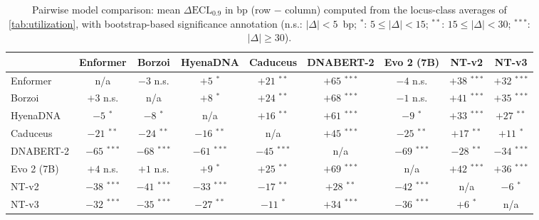 \begin{table}[t]
\centering
\caption{Pairwise model comparison: mean $\Delta\mathrm{ECL}_{0.9}$ in bp (row $-$ column) computed from the locus-class averages of \cref{tab:utilization}, with bootstrap-based significance annotation (n.s.: $|\Delta|<5$~bp; $^{*}$: $5\le|\Delta|<15$; $^{**}$: $15\le|\Delta|<30$; $^{***}$: $|\Delta|\ge30$).}
\label{tab:pairwise_comparison}
\small
\begin{tabular}{lcccccccc}
\toprule
 & Enformer & Borzoi & HyenaDNA & Caduceus & DNABERT-2 & Evo 2 (7B) & NT-v2 & NT-v3 \\
\midrule
Enformer & n/a & $-3$ n.s. & $+5$ $^{*}$ & $+21$ $^{**}$ & $+65$ $^{***}$ & $-4$ n.s. & $+38$ $^{***}$ & $+32$ $^{***}$ \\
Borzoi & $+3$ n.s. & n/a & $+8$ $^{*}$ & $+24$ $^{**}$ & $+68$ $^{***}$ & $-1$ n.s. & $+41$ $^{***}$ & $+35$ $^{***}$ \\
HyenaDNA & $-5$ $^{*}$ & $-8$ $^{*}$ & n/a & $+16$ $^{**}$ & $+61$ $^{***}$ & $-9$ $^{*}$ & $+33$ $^{***}$ & $+27$ $^{**}$ \\
Caduceus & $-21$ $^{**}$ & $-24$ $^{**}$ & $-16$ $^{**}$ & n/a & $+45$ $^{***}$ & $-25$ $^{**}$ & $+17$ $^{**}$ & $+11$ $^{*}$ \\
DNABERT-2 & $-65$ $^{***}$ & $-68$ $^{***}$ & $-61$ $^{***}$ & $-45$ $^{***}$ & n/a & $-69$ $^{***}$ & $-28$ $^{**}$ & $-34$ $^{***}$ \\
Evo 2 (7B) & $+4$ n.s. & $+1$ n.s. & $+9$ $^{*}$ & $+25$ $^{**}$ & $+69$ $^{***}$ & n/a & $+42$ $^{***}$ & $+36$ $^{***}$ \\
NT-v2 & $-38$ $^{***}$ & $-41$ $^{***}$ & $-33$ $^{***}$ & $-17$ $^{**}$ & $+28$ $^{**}$ & $-42$ $^{***}$ & n/a & $-6$ $^{*}$ \\
NT-v3 & $-32$ $^{***}$ & $-35$ $^{***}$ & $-27$ $^{**}$ & $-11$ $^{*}$ & $+34$ $^{***}$ & $-36$ $^{***}$ & $+6$ $^{*}$ & n/a \\
\bottomrule
\end{tabular}
\end{table}
